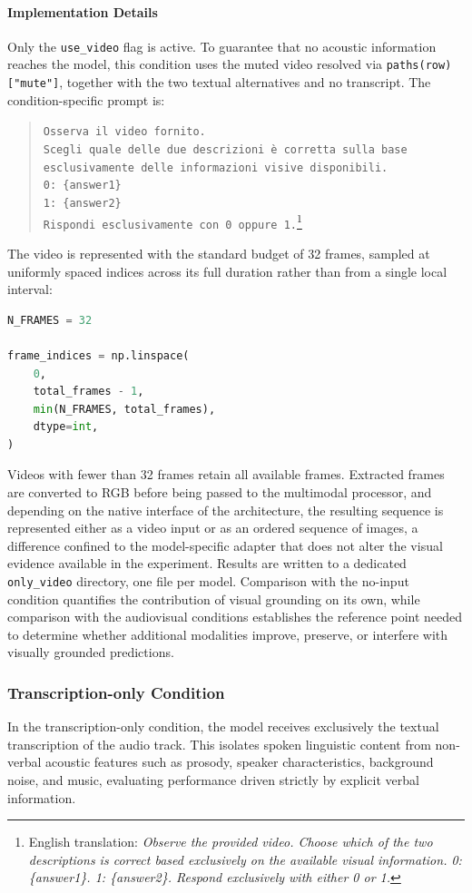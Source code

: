 \paragraph{Implementation Details}
Only the \texttt{use\_video} flag is active. To guarantee that no acoustic information reaches the model, this condition uses the muted video resolved via \texttt{paths(row)["mute"]}, together with the two textual alternatives and no transcript. The condition-specific prompt is:
\begin{quote}
\small
\texttt{Osserva il video fornito.}\\
\texttt{Scegli quale delle due descrizioni è corretta sulla base}\\
\texttt{esclusivamente delle informazioni visive disponibili.}\\[0.5em]
\texttt{0: \{answer1\}}\\
\texttt{1: \{answer2\}}\\[0.5em]
\texttt{Rispondi esclusivamente con 0 oppure 1.}\footnote{English translation: \textit{Observe the provided video. Choose which of the two descriptions is correct based exclusively on the available visual information. 0: \{answer1\}. 1: \{answer2\}. Respond exclusively with either 0 or 1.}}
\end{quote}
The video is represented with the standard budget of 32 frames, sampled at uniformly spaced indices across its full duration rather than from a single local interval:
\begin{lstlisting}[language=Python]
N_FRAMES = 32

frame_indices = np.linspace(
    0,
    total_frames - 1,
    min(N_FRAMES, total_frames),
    dtype=int,
)
\end{lstlisting}
Videos with fewer than 32 frames retain all available frames. Extracted frames are converted to RGB before being passed to the multimodal processor, and depending on the native interface of the architecture, the resulting sequence is represented either as a video input or as an ordered sequence of images, a difference confined to the model-specific adapter that does not alter the visual evidence available in the experiment.
Results are written to a dedicated \texttt{only\_video} directory, one file per model. Comparison with the no-input condition quantifies the contribution of visual grounding on its own, while comparison with the audiovisual conditions establishes the reference point needed to determine whether additional modalities improve, preserve, or interfere with visually grounded predictions.
\subsubsection*{Transcription-only Condition}
In the transcription-only condition, the model receives exclusively the textual transcription of the audio track. This isolates spoken linguistic content from non-verbal acoustic features such as prosody, speaker characteristics, background noise, and music, evaluating performance driven strictly by explicit verbal information.

